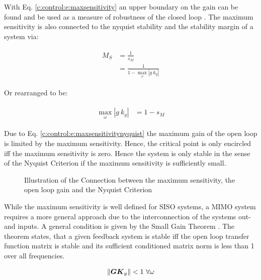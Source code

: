 With Eq. \ref{c:control:e:maxsensitivity} an upper boundary on the gain can be found and be used as a measure of robustness of the closed loop \cite[p.323 ff.]{Astrom2009}. The maximum sensitivity is also connected to the nyquist stability and the stability margin of a system via:

\begin{align}
\begin{split}
M_S &= \frac{1}{s_M} \\
&= \frac{1}{1 - \max_\omega \left| g ~k_y \right|}
\end{split}
\label{c:control:e:maxsensitivitynyquist}
\end{align}

Or rearranged to be:

\begin{align}
\begin{split}
\max_\omega \left| g~k_y\right| &= 1 - s_M
\end{split}
\end{align}

Due to Eq. \ref{c:control:e:maxsensitivitynyquist} the maximum gain of the open loop is limited by the maximum sensitivity. Hence, the critical point is only encircled iff the maximum sensitivity is zero. Hence the system is only stable in the sense of the Nyquist Criterion if the maximum sensitivity is sufficiently small.\\

\begin{figure}[H]\centering

\caption{Illustration of the Connection between the maximum sensitivity, the open loop gain and the Nyquist Criterion}
\label{c:control:f:maxsensitivitynyquist}
\end{figure}



While the maximum sensitivity is well defined for SISO systems, a MIMO system requires a more general approach due to the interconnection of the systems out- and inputs. A general condition is given by the Small Gain Theorem \cite[p.150 ff.]{Skogestad2005}. The theorem states, that a given feedback system is stable iff the open loop transfer function matrix is stable and its sufficient conditioned matrix norm is less than 1 over all frequencies.

\begin{align}
\lVert \mbox{\boldmath$G$} \mbox{\boldmath$K$}_y \rVert < 1 ~\forall \omega
\label{c:control:e:SmallGainTheorem}
\end{align}

